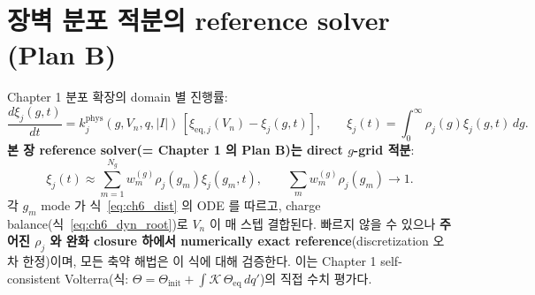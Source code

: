 \documentclass[11pt,a4paper]{article}
\newcommand{\eq}{\mathrm{eq}}
\begin{document}
\section{장벽 분포 적분의 reference solver (Plan B)}\label{sec:ch6_grid}
Chapter 1 분포 확장의 domain 별 진행률:
\begin{equation}
\frac{d\xi_j(g,t)}{dt}=k_j^{\mathrm{phys}}(g,V_n,q,|I|)\,[\xi_{\eq,j}(V_n)-\xi_j(g,t)],\qquad
\xi_j(t)=\int_0^\infty\rho_j(g)\xi_j(g,t)\,dg.
\label{eq:ch6_dist}
\end{equation}
\textbf{본 장 reference solver(= Chapter 1 의 Plan B)는 direct $g$-grid 적분}:
\begin{equation}
\xi_j(t)\approx\sum_{m=1}^{N_g}w_m^{(g)}\rho_j(g_m)\xi_j(g_m,t),\qquad \sum_m w_m^{(g)}\rho_j(g_m)\to1.
\label{eq:ch6_grid}
\end{equation}
각 $g_m$ mode 가 식~\eqref{eq:ch6_dist} 의 ODE 를 따르고, charge balance(식~\eqref{eq:ch6_dyn_root})로
$V_n$ 이 매 스텝 결합된다. 빠르지 않을 수 있으나 \textbf{주어진 $\rho_j$ 와 완화 closure 하에서 numerically
exact reference}(discretization 오차 한정)이며, 모든 축약 해법은 이 식에 대해 검증한다. 이는 Chapter 1
self-consistent Volterra(식: $\Theta=\Theta_{\mathrm{init}}+\int\mathcal K\,\Theta_{\eq}\,dq'$)의 직접 수치 평가다.

\end{document}
